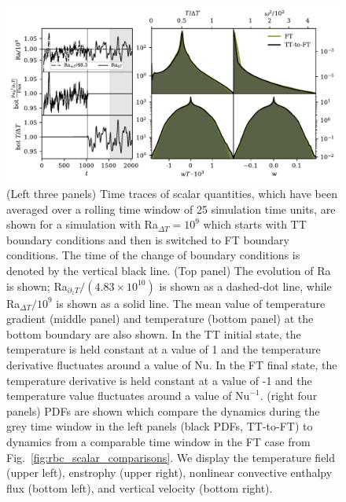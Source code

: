 \documentclass[aps, pre, onecolumn, nofootinbib, notitlepage, groupedaddress, amsfonts, amssymb, amsmath, longbibliography, superscriptaddress]{revtex4-1}
\begin{document}
\begin{figure}
\includegraphics[width=\textwidth]{./figs/rbc_restart_description.pdf}
\caption{ 
	(Left three panels) Time traces of scalar quantities, which have been averaged over a rolling time window of 25 simulation time units, are shown for a simulation with Ra$_{\Delta T} = 10^9$ which starts with TT boundary conditions and then is switched to FT boundary conditions.
	The time of the change of boundary conditions is denoted by the vertical black line.
	(Top panel) The evolution of Ra is shown; Ra$_{\partial_z T}/(4.83\times 10^{10})$ is shown as a dashed-dot line, while Ra$_{\Delta T}/10^9$ is shown as a solid line.
	The mean value of temperature gradient (middle panel) and temperature (bottom panel) at the bottom boundary are also shown.
	In the TT initial state, the temperature is held constant at a value of 1 and the temperature derivative fluctuates around a value of $\text{Nu}$.
	In the FT final state, the temperature derivative is held constant at a value of -1 and the temperature value fluctuates around a value of $\text{Nu}^{-1}$.
	(right four panels) PDFs are shown which compare the dynamics during the grey time window in the left panels (black PDFs, TT-to-FT) to dynamics from a comparable time window in the FT case from Fig.~\ref{fig:rbc_scalar_comparisons}.
	We display the temperature field (upper left), enstrophy (upper right), nonlinear convective enthalpy flux (bottom left), and vertical velocity (bottom right).
\label{fig:rbc_restart_description} }
\vspace{-0.25cm}
\end{figure}
\end{document}
